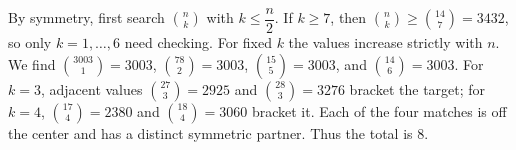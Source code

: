 By symmetry, first search $\binom nk$ with $k\le\dfrac{n}{2}$. If $k\ge7$, then $\binom nk\ge\binom{14}{7}=3432$, so only $k=1,\ldots,6$ need checking. For fixed $k$ the values increase strictly with $n$. We find $\binom{3003}{1}=3003$, $\binom{78}{2}=3003$, $\binom{15}{5}=3003$, and $\binom{14}{6}=3003$. For $k=3$, adjacent values $\binom{27}{3}=2925$ and $\binom{28}{3}=3276$ bracket the target; for $k=4$, $\binom{17}{4}=2380$ and $\binom{18}{4}=3060$ bracket it. Each of the four matches is off the center and has a distinct symmetric partner. Thus the total is $\boxed8$.
